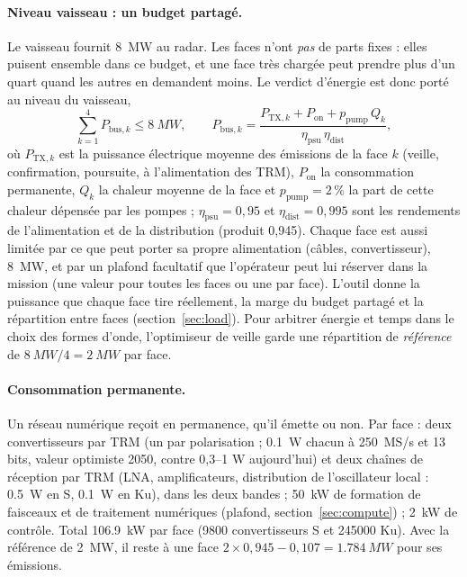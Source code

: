 \documentclass[11pt,a4paper]{article}
\begin{document}
\paragraph{Niveau vaisseau : un budget partagé.} Le vaisseau fournit \SI{8}{MW} au radar. Les faces n'ont \emph{pas}
de parts fixes : elles puisent ensemble dans ce budget, et une face très chargée peut prendre plus d'un quart quand les
autres en demandent moins. Le verdict d'énergie est donc porté au niveau du vaisseau,
\[
  \sum_{k=1}^{4} P_{\mathrm{bus},k} \le \SI{8}{MW},\qquad
  P_{\mathrm{bus},k} = \frac{P_{\mathrm{TX},k} + P_{\mathrm{on}} + p_{\mathrm{pump}}\,Q_k}{\eta_{\mathrm{psu}}\,\eta_{\mathrm{dist}}},
\]
où $P_{\mathrm{TX},k}$ est la puissance électrique moyenne des émissions de la face $k$ (veille, confirmation,
poursuite, à l'alimentation des TRM), $P_{\mathrm{on}}$ la consommation permanente, $Q_k$ la chaleur moyenne de la face
et $p_{\mathrm{pump}} = 2\,\%$ la part de cette chaleur dépensée par les pompes ; $\eta_{\mathrm{psu}} = 0,95$ et
$\eta_{\mathrm{dist}} = 0,995$ sont les rendements de l'alimentation et de la distribution (produit 0,945). Chaque face
est aussi limitée par ce que peut porter sa propre alimentation (câbles, convertisseur), \SI{8}{MW}, et par un plafond
facultatif que l'opérateur peut lui réserver dans la mission (une valeur pour toutes les faces ou une par face).
L'outil donne la puissance que chaque face tire réellement, la marge du budget partagé et la répartition entre faces
(section~\ref{sec:load}). Pour arbitrer énergie et temps dans le choix des formes d'onde, l'optimiseur de veille garde
une répartition de \emph{référence} de $\SI{8}{MW}/4 = \SI{2}{MW}$ par face.

\paragraph{Consommation permanente.} Un réseau numérique reçoit en permanence, qu'il émette ou non. Par face : deux
convertisseurs par TRM (un par polarisation ; \SI{0.1}{W} chacun à \SI{250}{MS/s} et 13 bits, valeur optimiste 2050,
contre 0,3--1 W aujourd'hui) et deux chaînes de réception par TRM (LNA, amplificateurs, distribution de l'oscillateur
local : \SI{0.5}{W} en S, \SI{0.1}{W} en Ku), dans les deux bandes ; \SI{50}{kW} de formation de faisceaux et de
traitement numériques (plafond, section~\ref{sec:compute}) ; \SI{2}{kW} de contrôle. Total \SI{106.9}{kW} par face
(\num{9800} convertisseurs S et \num{245000} Ku). Avec la référence de \SI{2}{MW}, il reste à une face
$2\times0,945 - 0,107 = \SI{1.784}{MW}$ pour ses émissions.
\end{document}
